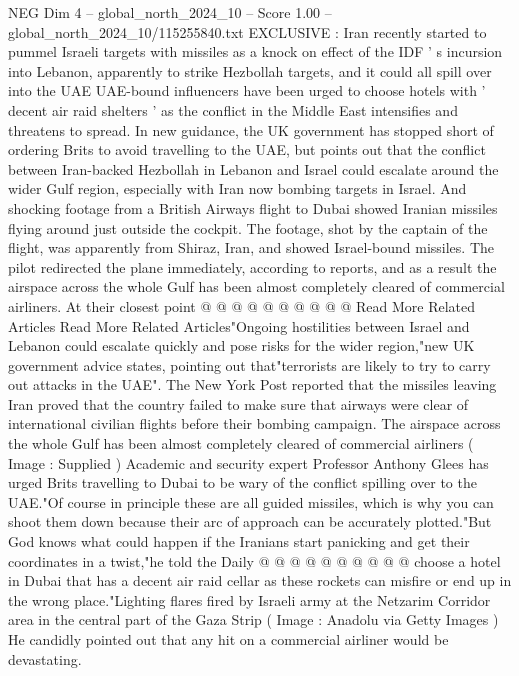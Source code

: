 \begin{textsample}{NEG Dim 4 – global\_north\_2024\_10 – Score 1.00 – global\_north\_2024\_10/115255840.txt}  \label{ex:f4_neg_058}
EXCLUSIVE : Iran recently started to pummel Israeli targets with missiles as a knock on effect of the IDF ' s incursion into Lebanon, apparently to strike Hezbollah targets, and it could all spill over into the UAE UAE-bound influencers have been urged to choose hotels with ' decent air raid shelters ' as the conflict in the Middle East intensifies and threatens to spread.
In new guidance, the UK government has stopped short of ordering Brits to avoid travelling to the UAE, but points out that the conflict between Iran-backed Hezbollah in Lebanon and Israel could escalate around the wider Gulf region, especially with Iran now bombing targets in Israel.
And shocking footage from a British Airways flight to Dubai showed Iranian missiles flying around just outside the cockpit.
The footage, shot by the captain of the flight, was apparently from Shiraz, Iran, and showed Israel-bound missiles.
The pilot redirected the plane immediately, according to reports, and as a result the airspace across the whole Gulf has been almost completely cleared of commercial airliners.
At their closest point @ @ @ @ @ @ @ @ @ @ Read More Related Articles Read More Related Articles"Ongoing hostilities between Israel and Lebanon could escalate quickly and pose risks for the wider region,"new UK government advice states, pointing out that"terrorists are likely to try to carry out attacks in the UAE".
The New York Post reported that the missiles leaving Iran proved that the country failed to make sure that airways were clear of international civilian flights before their bombing campaign.
The airspace across the whole Gulf has been almost completely cleared of commercial airliners ( Image : Supplied ) Academic and security expert Professor Anthony Glees has urged Brits travelling to Dubai to be wary of the conflict spilling over to the UAE."Of course in principle these are all guided missiles, which is why you can shoot them down because their arc of approach can be accurately plotted."But God knows what could happen if the Iranians start panicking and get their coordinates in a twist,"he told the Daily @ @ @ @ @ @ @ @ @ @ choose a hotel in Dubai that has a decent air raid cellar as these rockets can misfire or end up in the wrong place."Lighting flares fired by Israeli army at the Netzarim Corridor area in the central part of the Gaza Strip ( Image : Anadolu via Getty Images ) He candidly pointed out that any hit on a commercial airliner would be devastating.

\end{textsample}
